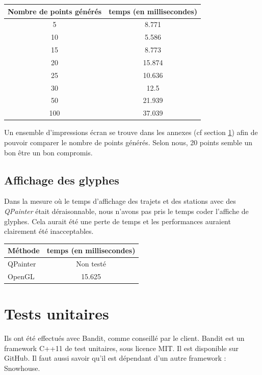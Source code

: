 \documentclass[12pt]{article}
\begin{document}
		\begin{center}
			\begin{tabular}{| c | c |}
			\hline
			\textbf{Nombre de points générés} & \textbf{temps (en millisecondes)}\\ \hline
			5  &  8.771 \\ \hline
			10 &  5.586 \\ \hline
			15 &  8.773 \\ \hline
			20 &  15.874 \\ \hline
			25 &  10.636 \\ \hline
			30 &  12.5 \\ \hline
			50 &  21.939\\ \hline
			100 &  37.039 \\ \hline
		    \end{tabular}
	    \end{center}
	    
	    Un ensemble d'impressions écran se trouve dans les annexes (cf section \ref{}) afin
	    de pouvoir comparer le nombre de points générés. Selon nous, 20 points semble un bon être
	    un bon compromis.\\
	    
		\subsection{Affichage des glyphes}
		Dans la mesure où le temps d'affichage des trajets et des stations avec des \textit{QPainter}
		était déraisonnable, nous n'avons pas pris le temps coder l'affiche de glyphes. Cela aurait été 
		une perte de temps et les performances auraient clairement été inacceptables.
		
		\begin{center}
			\begin{tabular}{| l | c |}
			\hline
			\textbf{Méthode} & \textbf{temps (en millisecondes)} \\ \hline
			QPainter & Non testé\\ \hline
			OpenGL & 15.625 \\ \hline
		    \end{tabular}
	    \end{center}
		
	\newpage
	\section{Tests unitaires}
	Ils ont été effectués avec Bandit, comme conseillé par le client.
	Bandit est un framework C++11 de test unitaires, sous licence MIT. Il est disponible sur GitHub. 		Il faut aussi savoir qu’il est dépendant d’un autre framework : Snowhouse.\\
\end{document}
